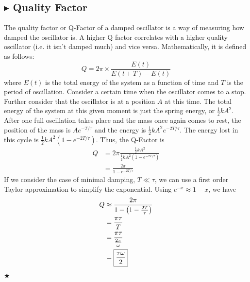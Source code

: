 \subsection{\color{Orchid} $\blacktriangleright$ \color{black} Quality Factor}\label{1.6.5}
The quality factor or Q-Factor of a damped oscillator is a way of measuring how damped the oscillator is. A higher Q factor correlates with a higher quality oscillator (i.e. it isn't damped much) and vice versa. Mathematically, it is defined as follows:
\begin{equation}
    Q = 2\pi \times \frac{E(t)}{E(t+T)-E(t)}
\end{equation}
\noindent where $E(t)$ is the total energy of the system as a function of time and $T$ is the period of oscillation. Consider a certain time when the oscillator comes to a stop. Further consider that the oscillator is at a position $A$ at this time. The total energy of the system at this given moment is just the spring energy, or $\frac12 k A^2$. After one full oscillation takes place and the mass once again comes to rest, the position of the mass is $Ae^{-T/\tau}$ and the energy is $\frac12 k A^2 e^{-2T/\tau}$. The energy lost in this cycle is $\frac12 k A^2\left(1-e^{-2T/\tau}\right)$. Thus, the Q-Factor is 
\begin{align*}
    Q &= 2\pi\frac{\frac12 kA^2}{\frac12 k A^2\left(1-e^{-2T/\tau}\right)} \\
    &= \frac{2\pi}{1-e^{-2T/\tau}}
\end{align*}
\noindent If we consider the case of minimal damping, $T \ll \tau$, we can use a first order Taylor approximation to simplify the exponential. Using $e^{-x} \approx 1-x$, we have
\begin{align}
    Q &\approx \frac{2\pi}{1-\left(1-\frac{2T}{\tau}\right)} \nonumber \\
    &= \frac{\pi\tau}{T} \nonumber \\
    &= \frac{\pi\tau}{\frac{2\pi}{\omega}} \nonumber \\
    &= \boxed{\frac{\tau\omega}{2}}
\end{align}
$\bigstar$

%
%
